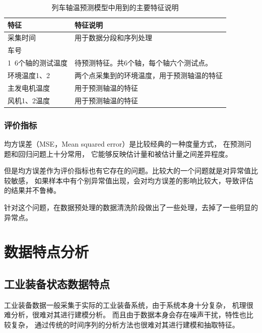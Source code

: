     \begin{table}
      \centering
      \caption{列车轴温预测模型中用到的主要特征说明}
      \begin{tabular}{ll}
        \toprule
        特征       & 特征说明                                       \\
        \midrule
        采集时间      & 用于数据分段和序列处理 \\
        车号          &\\
        1~6个轴的测试温度 & 待预测特征。共6个轴，每个轴六个测试点。 \\
        环境温度1、2  & 两个点采集到的环境温度，用于预测轴温的特征 \\
        主发电机温度  & 用于预测轴温的特征\\
        风机1、2温度  & 用于预测轴温的特征\\
        

        \bottomrule
      \end{tabular}
      \label{tab:features1}
    \end{table}
  \subsubsection{评价指标}
    均方误差（MSE，Mean squared error）是比较经典的一种度量方式，
    在预测问题和回归问题上十分常用，
    它能够反映估计量和被估计量之间差异程度。
  
    但是均方误差作为评价指标也有它存在的问题。比较大的一个问题就是对异常值比较敏感，
    如果样本中有个别异常值出现，会对均方误差的影响比较大，导致评估的结果并不鲁棒。
  
    针对这个问题，在数据预处理的数据清洗阶段做出了一些处理，去掉了一些明显的异常点。

\section{数据特点分析}
  \subsection{工业装备状态数据特点}
  工业装备数据一般采集于实际的工业装备系统，由于系统本身十分复杂，
  机理很难分析，很难对其进行建模分析。
  而且由于数据本身会存在噪声干扰，特性也比较复杂，
  通过传统的时间序列的分析方法也很难对其进行建模和抽取特征。
  
